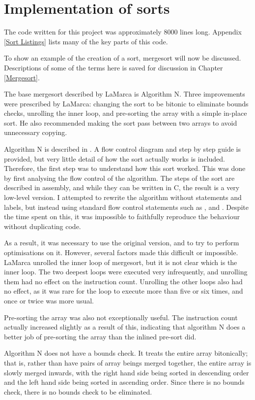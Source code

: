 \section{Implementation of sorts}

The  code written for this project was approximately 8000 lines long.
Appendix \ref{Sort Listings} lists many of the key parts of this code.

To show an example of the creation of a sort, mergesort will now be discussed.
Descriptions of some of the terms here is saved for discussion in Chapter
\ref{Mergesort}.

The base mergesort described by LaMarca is Algorithm N. Three improvements
were prescribed by LaMarca: changing the sort to be bitonic to eliminate bounds
checks, unrolling the inner loop, and pre-sorting the array with a simple in-place
sort. He also recommended making the sort pass between two arrays to avoid
unnecessary copying.

Algorithm N is described in \cite{Knuth98}. A flow control diagram and step by
step guide is provided, but very little detail of how the sort actually works is
included. Therefore, the first step was to understand how this sort worked. This
was done by first analysing the flow control of the algorithm. The steps of the
sort are described in assembly, and while they can be written in C, the result
is a very low-level version. I attempted to rewrite the algorithm without
 statements and labels, but instead using standard flow control
statements such as ,  and . Despite the time spent
on this, it was impossible to faithfully reproduce the behaviour without
duplicating code.

As a result, it was necessary to use the original version, and to try to perform
optimisations on it. However, several factors made this difficult or impossible.
LaMarca unrolled the inner loop of mergesort, but it is not clear which is the
inner loop. The two deepest loops were executed very infrequently, and
unrolling them had no effect on the instruction count. Unrolling the other loops
also had no effect, as it was rare for the loop to execute more than five or six
times, and once or twice was more usual.

Pre-sorting the array was also not exceptionally useful. The instruction count
actually increased slightly as a result of this, indicating that algorithm N
does a better job of pre-sorting the array than the inlined pre-sort did.

Algorithm N does not have a bounds check. It treats the entire array
bitonically; that is, rather than have pairs of array beings merged together,
the entire array is slowly merged inwards, with the right hand side being sorted
in descending order and the left hand side being sorted in ascending order.
Since there is no bounds check, there is no bounds check to be eliminated.

